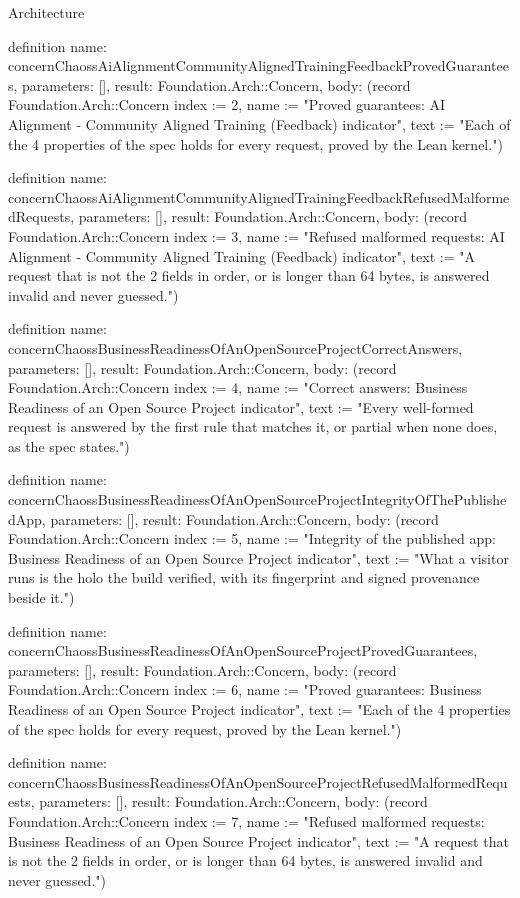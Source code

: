 \begin{lexlean}{Architecture}
\begin{semanticmodule}
definition{
  name: concernChaossAiAlignmentCommunityAlignedTrainingFeedbackProvedGuarantees,
  parameters: [],
  result: Foundation.Arch::Concern,
  body: (record Foundation.Arch::Concern {index := 2, name := "Proved guarantees: AI Alignment - Community Aligned Training (Feedback) indicator", text := "Each of the 4 properties of the spec holds for every request, proved by the Lean kernel."})
}

definition{
  name: concernChaossAiAlignmentCommunityAlignedTrainingFeedbackRefusedMalformedRequests,
  parameters: [],
  result: Foundation.Arch::Concern,
  body: (record Foundation.Arch::Concern {index := 3, name := "Refused malformed requests: AI Alignment - Community Aligned Training (Feedback) indicator", text := "A request that is not the 2 fields in order, or is longer than 64 bytes, is answered invalid and never guessed."})
}

definition{
  name: concernChaossBusinessReadinessOfAnOpenSourceProjectCorrectAnswers,
  parameters: [],
  result: Foundation.Arch::Concern,
  body: (record Foundation.Arch::Concern {index := 4, name := "Correct answers: Business Readiness of an Open Source Project indicator", text := "Every well-formed request is answered by the first rule that matches it, or partial when none does, as the spec states."})
}

definition{
  name: concernChaossBusinessReadinessOfAnOpenSourceProjectIntegrityOfThePublishedApp,
  parameters: [],
  result: Foundation.Arch::Concern,
  body: (record Foundation.Arch::Concern {index := 5, name := "Integrity of the published app: Business Readiness of an Open Source Project indicator", text := "What a visitor runs is the holo the build verified, with its fingerprint and signed provenance beside it."})
}

definition{
  name: concernChaossBusinessReadinessOfAnOpenSourceProjectProvedGuarantees,
  parameters: [],
  result: Foundation.Arch::Concern,
  body: (record Foundation.Arch::Concern {index := 6, name := "Proved guarantees: Business Readiness of an Open Source Project indicator", text := "Each of the 4 properties of the spec holds for every request, proved by the Lean kernel."})
}

definition{
  name: concernChaossBusinessReadinessOfAnOpenSourceProjectRefusedMalformedRequests,
  parameters: [],
  result: Foundation.Arch::Concern,
  body: (record Foundation.Arch::Concern {index := 7, name := "Refused malformed requests: Business Readiness of an Open Source Project indicator", text := "A request that is not the 2 fields in order, or is longer than 64 bytes, is answered invalid and never guessed."})
}


\end{semanticmodule}
\end{lexlean}
